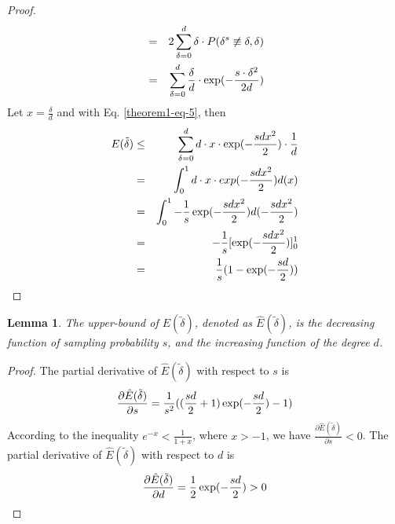 \documentclass{sig-alternate-2013}
\begin{document}
\begin{proof}
\begin{eqnarray}
&=& 2\sum_{\delta=0}^{d} {\delta \cdot P( \delta^s \not\equiv \delta, \delta) } \notag \\
&=& \sum_{\delta=0}^{d} { \frac{\delta}{d} \cdot \exp(-\frac{s\cdot \delta^2}{2d})}
\end{eqnarray}
Let $x=\frac{\delta}{d}$ and with Eq. \eqref{theorem1-eq-5}, then
\begin{eqnarray}
E(\tilde\delta) &\leq& \sum_{\delta=0}^{d} {d\cdot x\cdot \exp(-\frac{s d x^2}{2})\cdot \frac{1}{d}} \notag\\
&=& \int_0^{1} {d \cdot x \cdot exp(-\frac{s d x^2}{2})} d(x)\notag \\
&=& \int_0^{1} {-\frac{1}{s} \exp(-\frac{s d x^2}{2})d(-\frac{s d x^2}{2})} \notag \\
&=& -\frac{1}{s} [\exp(-\frac{s d x^2}{2})]_0^{1} \notag \\
&=& \frac{1}{s} (1-\exp(-\frac{s d}{2})) \notag
\end{eqnarray}
\end{proof}

\newtheorem{lemma}{Lemma}
\begin{lemma}\label{lemma-partitioning-error-func-property}
The upper-bound of $E(\tilde\delta)$, denoted as $\hat{E}(\tilde\delta)$, is the decreasing function of sampling probability $s$, and the increasing function of the degree $d$.
\end{lemma}
\begin{proof}
The partial derivative of $\hat{E}(\tilde\delta)$ with respect to $s$ is
\begin{eqnarray}
\frac{\partial \hat{E}(\tilde\delta)}{\partial s} = \frac{1}{s^2}((\frac{sd}{2} + 1)\exp(-\frac{sd}{2})-1) \notag
\end{eqnarray}
According to the inequality $e^{-x} < \frac{1}{1+x}$, where $x>-1$, we have $\frac{\partial \hat{E}(\tilde\delta) }{\partial s} < 0$.
The partial derivative of $\hat{E}(\tilde\delta)$ with respect to $d$ is
\begin{eqnarray}
\frac{\partial \hat{E}(\tilde\delta) }{\partial d} = \frac{1}{2}\exp(-\frac{sd}{2}) > 0 \notag
\end{eqnarray}
\end{proof}
\end{document}
